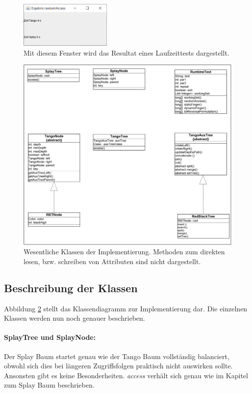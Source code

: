 \documentclass[a4paper,12pt]{article}
\begin{document}
\begin{figure}[H]
	\centering
	\includegraphics[width=0.4\textwidth]{Medien/laufzeittest/ResultGUI}
	\caption{Mit diesem Fenster wird das Resultat eines Laufzeittests dargestellt.}
	\label{fig:ResultGUI}
\end{figure}


\begin{figure}[H]
	\centering
	\includegraphics[width=1\textwidth]{Medien/laufzeittest/klassen}
	\caption{Wesentliche Klassen der Implementierung. Methoden zum direkten lesen, bzw. schreiben von Attributen sind nicht dargestellt. }
	\label{fig:klassen}
\end{figure}

\subsection{Beschreibung der Klassen }
Abbildung \ref{fig:klassen} stellt das Klassendiagramm zur Implementierung dar. Die einzelnen Klassen werden nun noch genauer beschrieben.
\paragraph{SplayTree und SplayNode:}
Der Splay Baum startet genau wie der Tango Baum vollständig balanciert, obwohl sich dies bei längeren Zugriffsfolgen praktisch nicht auswirken sollte. Ansonsten gibt es keine Besonderheiten. \textit{access} verhält sich genau wie im Kapitel zum Splay Baum beschrieben. 
\end{document}

